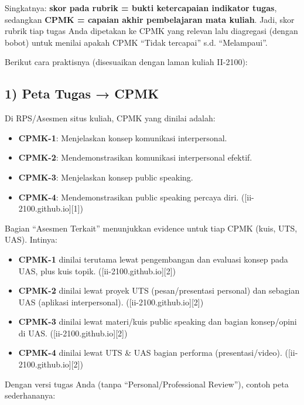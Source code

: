 \documentclass[
  letterpaper,
  DIV=11,
  numbers=noendperiod]{scrreprt}
\providecommand{\tightlist}{%
  \setlength{\itemsep}{0pt}\setlength{\parskip}{0pt}}
\begin{document}

Singkatnya: \textbf{skor pada rubrik = bukti ketercapaian indikator
tugas}, sedangkan \textbf{CPMK = capaian akhir pembelajaran mata
kuliah}. Jadi, skor rubrik tiap tugas Anda dipetakan ke CPMK yang
relevan lalu diagregasi (dengan bobot) untuk menilai apakah CPMK ``Tidak
tercapai'' s.d. ``Melampaui''.

Berikut cara praktisnya (disesuaikan dengan laman kuliah II-2100):

\subsection*{1) Peta Tugas → CPMK}\label{peta-tugas-cpmk}

Di RPS/Asesmen situs kuliah, CPMK yang dinilai adalah:

\begin{itemize}
\tightlist
\item
  \textbf{CPMK-1}: Menjelaskan konsep komunikasi interpersonal.
\item
  \textbf{CPMK-2}: Mendemonstrasikan komunikasi interpersonal efektif.
\item
  \textbf{CPMK-3}: Menjelaskan konsep public speaking.
\item
  \textbf{CPMK-4}: Mendemonstrasikan public speaking percaya diri.
  ({[}ii-2100.github.io{]}{[}1{]})
\end{itemize}

Bagian ``Asesmen Terkait'' menunjukkan evidence untuk tiap CPMK (kuis,
UTS, UAS). Intinya:

\begin{itemize}
\tightlist
\item
  \textbf{CPMK-1} dinilai terutama lewat pengembangan dan evaluasi
  konsep pada UAS, plus kuis topik. ({[}ii-2100.github.io{]}{[}2{]})
\item
  \textbf{CPMK-2} dinilai lewat proyek UTS (pesan/presentasi personal)
  dan sebagian UAS (aplikasi interpersonal).
  ({[}ii-2100.github.io{]}{[}2{]})
\item
  \textbf{CPMK-3} dinilai lewat materi/kuis public speaking dan bagian
  konsep/opini di UAS. ({[}ii-2100.github.io{]}{[}2{]})
\item
  \textbf{CPMK-4} dinilai lewat UTS \& UAS bagian performa
  (presentasi/video). ({[}ii-2100.github.io{]}{[}2{]})
\end{itemize}

Dengan versi tugas Anda (tanpa ``Personal/Professional Review''), contoh
peta sederhananya:
\end{document}
